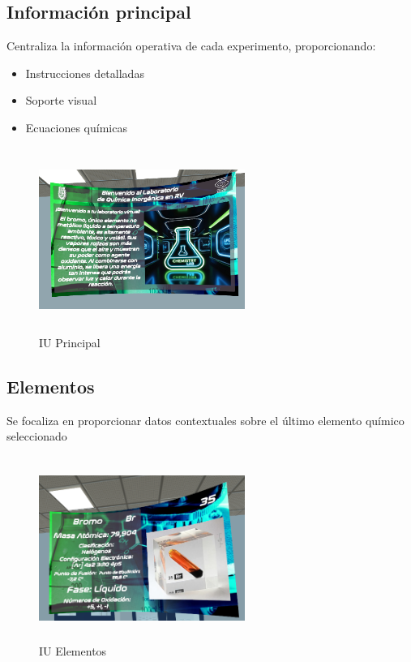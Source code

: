 \subsection{Información principal}
Centraliza la información operativa de cada experimento, proporcionando:
\begin{itemize}
    \item Instrucciones detalladas
    \item Soporte visual
    \item Ecuaciones químicas
\end{itemize}
\begin{figure}[thbp]
    \centering
    \includegraphics[width=0.6\textwidth, height = 6cm]{img/chapter04/UI_Principal.png}
    \caption{IU Principal}
    \label{fig:Principal_IU}
\end{figure}

\subsection{Elementos}
Se focaliza en proporcionar datos contextuales sobre el último elemento químico seleccionado
\begin{figure}[thbp]
    \centering
    \includegraphics[width=0.6\textwidth, height = 6cm]{img/chapter04/UI_Elements.png}
    \caption{IU Elementos}
    \label{fig:Elementos_IU}
\end{figure}

